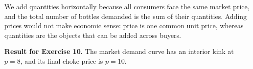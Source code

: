 \documentclass[11pt,a4paper]{article}
\begin{document}
We add quantities horizontally because all consumers face the same market
price, and the total number of bottles demanded is the sum of their
quantities. Adding prices would not make economic sense: price is one common
unit price, whereas quantities are the objects that can be added across
buyers.

\begin{solutionbox}
\textbf{Result for Exercise 10.} The market demand curve has an interior
kink at \(p=8\), and its final choke price is \(p=10\).
\end{solutionbox}
\end{document}
